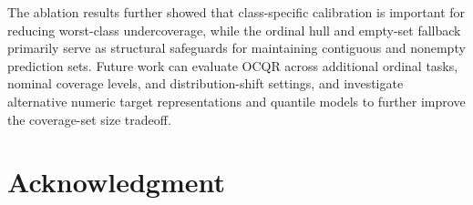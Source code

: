 \documentclass[conference]{IEEEtran}
\begin{document}
The ablation results further showed that class-specific calibration is important for reducing worst-class undercoverage, while the ordinal hull and empty-set fallback primarily serve as structural safeguards for maintaining contiguous and nonempty prediction sets. Future work can evaluate OCQR across additional ordinal tasks, nominal coverage levels, and distribution-shift settings, and investigate alternative numeric target representations and quantile models to further improve the coverage-set size tradeoff.



\section*{Acknowledgment}
\end{document}
